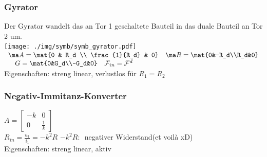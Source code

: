 \documentclass[fs, footer]{latex4ei}
\begin{document}
\begin{multicols*}{4}
    \subsubsection{Gyrator}
    Der Gyrator wandelt das an Tor 1 geschaltete Bauteil in das duale Bauteil an Tor 2 um.\\
    \texttt{[image: ./img/symb/symb\_gyrator.pdf]}
    $\begin{array}{l}
            \ma A=\mat{0 & R_d \\ \frac{1}{R_d} & 0}\mathrm{\quad}\ma R = \mat{0&-R_d\\R_d&0}\\ \mathrm{\quad} G = \mat{0&G_d\\-G_d&0}\mathrm{\quad}\mathcal F_{in}=\mathcal F^d
        \end{array}$\\
    Eigenschaften: streng linear, verlustlos für $R_1=R_2$\\

    \subsubsection{Negativ-Immitanz-Konverter}
    $A=\begin{bmatrix} -k & 0 \\ 0 & \frac{1}{k} \end{bmatrix}$\\
    $R_{in}=\frac{u_1}{i_1}=-k^2R$ \quad $-k^2 R:$\ negativer Widerstand(et voilà xD)\\
    Eigenschaften: streng linear, aktiv



\end{multicols*}
\end{document}
